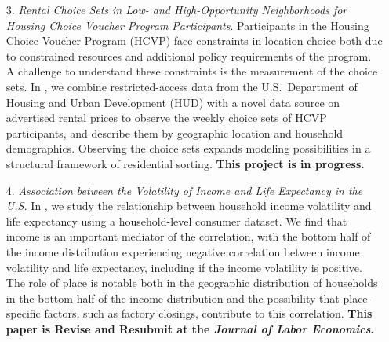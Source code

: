 \begin{enumerate}

\item[3.] \textit{Rental Choice Sets in Low- and High-Opportunity Neighborhoods for Housing Choice Voucher Program Participants}. Participants in the Housing Choice Voucher Program (HCVP) face constraints in location choice both due to constrained resources and additional policy requirements of the program. A challenge to understand these constraints is the measurement of the choice sets. In \citet{park_rental_2023}, we combine restricted-access data from the U.S.\ Department of Housing and Urban Development (HUD) with a novel data source on advertised rental prices to observe the weekly choice sets of HCVP participants, and describe them by geographic location and household demographics. Observing the choice sets expands modeling possibilities in a structural framework of residential sorting. \textbf{This project is in progress.}


\item[4.] \textit{Association between the Volatility of Income and Life Expectancy in the U.S.} In \citet{ziff_association_2023}, we study the relationship between household income volatility and life expectancy using a household-level consumer dataset. We find that income is an important mediator of the correlation, with the bottom half of the income distribution experiencing negative correlation between income volatility and life expectancy, including if the income volatility is positive. The role of place is notable both in the geographic distribution of households in the bottom half of the income distribution and the possibility that place-specific factors, such as factory closings, contribute to this correlation. \textbf{This paper is Revise and Resubmit at the \textit{Journal of Labor Economics}.}


\end{enumerate}

\singlespacing





